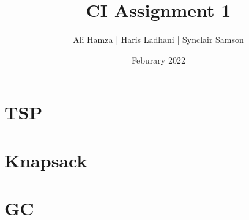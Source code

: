 \documentclass{article}
\title{CI Assignment 1}
\date{Feburary 2022}
\author{Ali Hamza | Haris Ladhani | Synclair Samson}
\begin{document}
\maketitle

\section{TSP}


\section{Knapsack}


\section{GC}
\end{document}
